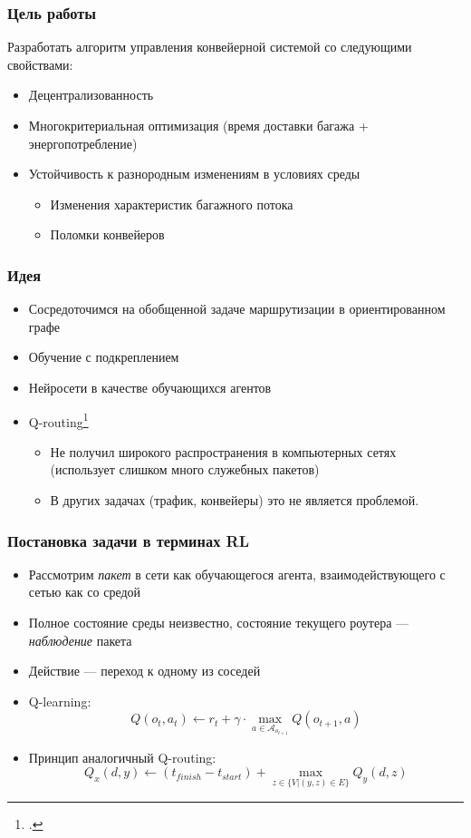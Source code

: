\documentclass{beamer}
\begin{document}

\begin{frame}
  \frametitle{Цель работы}
  Разработать алгоритм управления конвейерной системой со следующими свойствами:
  \begin{itemize}
  \item Децентрализованность
  \item Многокритериальная оптимизация (время доставки багажа +
    энергопотребление)
  \item Устойчивость к разнородным изменениям в условиях среды
    \begin{itemize}
    \item Изменения характеристик багажного потока
    \item Поломки конвейеров
    \end{itemize}
  \end{itemize}
\end{frame}


\begin{frame}
  \frametitle{Идея}
  \begin{itemize}
  \item Сосредоточимся на обобщенной задаче маршрутизации в ориентированном графе
  \item Обучение с подкреплением
  \item Нейросети в качестве обучающихся агентов
  \item Q-routing\footcite{q-routing-orig}
    \begin{itemize}
    \item Не получил широкого распространения в компьютерных сетях (использует
      слишком много служебных пакетов)
    \item В других задачах (трафик, конвейеры) это не является проблемой.
    \end{itemize}
  \end{itemize}
\end{frame}


\begin{frame}
  \frametitle{Постановка задачи в терминах RL}
  \begin{itemize}
    \item Рассмотрим \textit{пакет} в сети как обучающегося агента,
      взаимодействующего с сетью как со средой
    \item Полное состояние среды неизвестно, состояние текущего роутера ---
      \textit{наблюдение} пакета
    \item Действие --- переход к одному из соседей
    \item Q-learning:
      \[
      Q(o_t, a_t) \leftarrow r_t + \gamma \cdot
      \max\limits_{a \in \mathcal{A}_{o_{t+1}}} {Q(o_{t+1}, a)}
      \]
    \item Принцип аналогичный Q-routing:
      \[
      Q_x(d, y) \leftarrow (t_{finish} - t_{start}) +
      \max\limits_{z \in \{ V | (y, z) \in E\}} {Q_y(d, z)}
      \]
  \end{itemize}
\end{frame}
\end{document}

